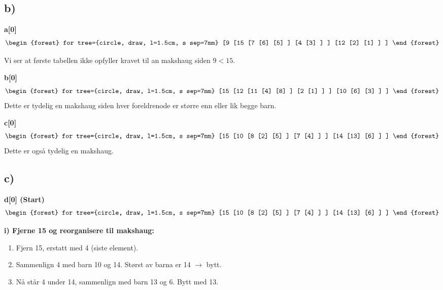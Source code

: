 \documentclass[12pt]{article}
\begin{document}
\subsection*{b)} 

\noindent 
\textbf{a[0]}
\begin{gather*}
\begin{forest}
for tree={circle, draw, l=1.5cm, s sep=7mm}
[9
  [15
    [7
        [6]
        [5]
    ]
    [4
        [3]
    ]
  ]
  [12
    [2]
    [1]
  ]
]
\end{forest}
\end{gather*}

\noindent
Vi ser at første tabellen ikke opfyller kravet til an makshaug siden \(9 < 15\).

\noindent
\textbf{b[0]}
\begin{gather*}
\begin{forest}
for tree={circle, draw, l=1.5cm, s sep=7mm}
[15
  [12
    [11
        [4]
        [8]
    ]
    [2
        [1]
    ]
  ]
  [10
    [6]
    [3]
  ]
]
\end{forest}
\end{gather*}
Dette er tydelig en makshaug siden hver foreldrenode er større enn eller lik begge barn.

\noindent
\textbf{c[0]}
\begin{gather*}
\begin{forest}
for tree={circle, draw, l=1.5cm, s sep=7mm}
[15
  [10
    [8
        [2]
        [5]
    ]
    [7
        [4]
    ]
  ]
  [14
    [13]
    [6]
  ]
]
\end{forest}
\end{gather*}
Dette er også tydelig en makshaug.

\subsection*{c)}
\textbf{d[0] (Start)}
\begin{gather*}
\begin{forest}
for tree={circle, draw, l=1.5cm, s sep=7mm}
[15
  [10
    [8
        [2]
        [5]
    ]
    [7
        [4]
    ]
  ]
  [14
    [13]
    [6]
  ]
]
\end{forest}
\end{gather*}

\noindent 
\textbf{i) Fjerne 15 og reorganisere til makshaug:}

\begin{enumerate}
    \item Fjern 15, erstatt med 4 (siste element).
    \item Sammenlign 4 med barn 10 og 14. Størst av barna er 14 $\rightarrow$ bytt.
    \item Nå står 4 under 14, sammenlign med barn 13 og 6. Bytt med 13.
\end{enumerate}
\end{document}
